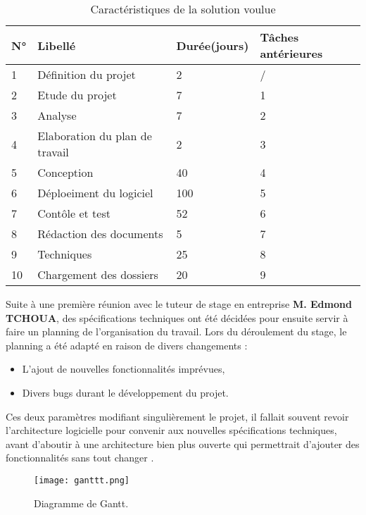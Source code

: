 {{\begin{table}[H]
	\caption{Caractéristiques de la solution voulue}
	\label{Caractéristiques de la solution voulue}
	\centering
	\begin{tabularx}{\linewidth}{|X|X|X|X|}
		\hline \rowcolor{lightgray}  
		\textbf{N°} & \textbf{Libellé} & \textbf{Durée(jours)} & \textbf{Tâches antérieures} \\
		\hline
		1 & Définition du projet &  2 & / \\
		\hline
		2 & Etude du projet &  7 & 1\\
		\hline
		3 & Analyse & 7 & 2 \\
		\hline
		4  & Elaboration du plan de travail &  2 & 3 \\	
		\hline
		5 & Conception &  40 & 4 \\
		\hline
		6 & Déploeiment du logiciel &  100 & 5 \\
		\hline
		7 & Contôle et test  & 52 & 6 \\
		\hline
		8  & Rédaction des documents &  5 & 7 \\	
		\hline
		9 & Techniques &  25 & 8 \\
		\hline
		10 & Chargement des dossiers  & 20 & 9 \\
		\hline
		
	\end{tabularx}
\end{table}

Suite à une première réunion avec le tuteur de stage en entreprise \textbf{M. Edmond TCHOUA}, des spécifications techniques ont été décidées pour ensuite servir à faire un planning de l’organisation du travail. Lors du déroulement du stage, le planning a été adapté en raison de divers changements :

\begin{itemize}[label=\textbullet, font=\LARGE \color{blue}] 
	\item L’ajout de nouvelles fonctionnalités imprévues,
	\item Divers bugs durant le développement du projet.
\end{itemize}

Ces deux paramètres modifiant singulièrement le projet, il fallait souvent revoir l’architecture logicielle pour convenir aux nouvelles spécifications techniques, avant d’aboutir à une architecture bien plus ouverte qui permettrait d’ajouter des fonctionnalités sans tout changer .

\begin{figure}[H]
	\centering
	\texttt{[image: ganttt.png]}
	\caption{Diagramme de Gantt.}
	\label{fig:mvc}
\end{figure}

}}

